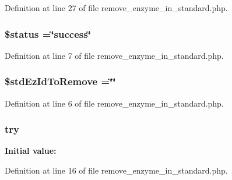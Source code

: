 Definition at line 27 of file remove\-\_\-enzyme\-\_\-in\-\_\-standard.\-php.

\hypertarget{remove__enzyme__in__standard_8php_a58391ea75f2d29d5d708d7050b641c33}{
\subsubsection[{\$status}]{\setlength{\rightskip}{0pt plus 5cm}\$status =\char`\"{}success\char`\"{}}}\label{remove__enzyme__in__standard_8php_a58391ea75f2d29d5d708d7050b641c33}


Definition at line 7 of file remove\-\_\-enzyme\-\_\-in\-\_\-standard.\-php.

\hypertarget{remove__enzyme__in__standard_8php_a82f60c379683413d3b4269adbe259606}{
\subsubsection[{\$std\-Ez\-Id\-To\-Remove}]{\setlength{\rightskip}{0pt plus 5cm}\$std\-Ez\-Id\-To\-Remove =\char`\"{}\char`\"{}}}\label{remove__enzyme__in__standard_8php_a82f60c379683413d3b4269adbe259606}


Definition at line 6 of file remove\-\_\-enzyme\-\_\-in\-\_\-standard.\-php.

\hypertarget{remove__enzyme__in__standard_8php_abe4cc9788f52e49485473dc699537388}{
\subsubsection[{try}]{\setlength{\rightskip}{0pt plus 5cm}try}}\label{remove__enzyme__in__standard_8php_abe4cc9788f52e49485473dc699537388}
{\bfseries Initial value\-:}


Definition at line 16 of file remove\-\_\-enzyme\-\_\-in\-\_\-standard.\-php.


